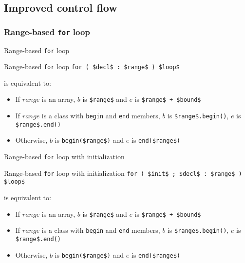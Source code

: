 \subsection{Improved control flow}

\subsubsection{Range-based \texttt{for} loop}

\begin{frame}{Range-based \texttt{for} loop}{}
  \begin{block}{Range-based \texttt{for} loop}
    {
      \hfill\lstinline[mathescape]!for ( $decl$ : $range$ ) $loop$!\hfill
    }

    is equivalent to:

    \smaller

    \begin{itemize}
    \item
      If $range$ is an array, $b$ is \lstinline[mathescape]!$range$! and $e$ is \lstinline[mathescape]!$range$ + $bound$!
    \item
      If $range$ is a class with \lstinline!begin! and \lstinline!end! members, $b$ is \lstinline[mathescape]!$range$.begin()!, $e$ is \lstinline[mathescape]!$range$.end()!
    \item
      Otherwise, $b$ is \lstinline[mathescape]!begin($range$)! and $e$ is \lstinline[mathescape]!end($range$)!
    \end{itemize}
  \end{block}
\end{frame}

\begin{frame}{Range-based \texttt{for} loop with initialization}{}
  \begin{block}{Range-based \texttt{for} loop with initialization}
    {
      \hfill\lstinline[mathescape]!for ( $init$ ; $decl$ : $range$ ) $loop$!\hfill
    }

    is equivalent to:

    \smaller

    \begin{itemize}
    \item
      If $range$ is an array, $b$ is \lstinline[mathescape]!$range$! and $e$ is \lstinline[mathescape]!$range$ + $bound$!
    \item
      If $range$ is a class with \lstinline!begin! and \lstinline!end! members, $b$ is \lstinline[mathescape]!$range$.begin()!, $e$ is \lstinline[mathescape]!$range$.end()!
    \item
      Otherwise, $b$ is \lstinline[mathescape]!begin($range$)! and $e$ is \lstinline[mathescape]!end($range$)!
    \end{itemize}
  \end{block}
\end{frame}

